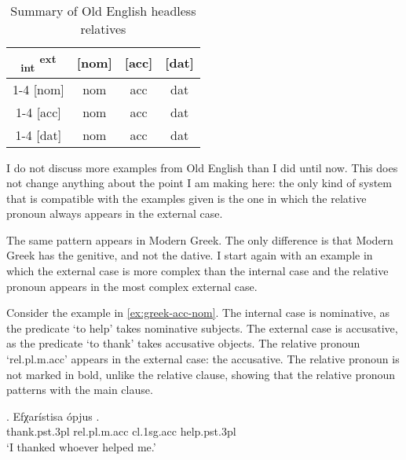 \begin{table}[H]
  \center
  \caption{Summary of Old English headless relatives}
  \begin{tabular}{c|c|c|c}
    \toprule
   \textsubscript{\ac{int}} \textsuperscript{\ac{ext}}
          & [\ac{nom}]
          & [\ac{acc}]
          & [\ac{dat}]
          \\ \cmidrule{1-4}
      [\ac{nom}]
          & \ac{nom}
          & \ac{acc}
          & \cellcolor{LG}\ac{dat}
          \\ \cmidrule{1-4}
      [\ac{acc}]
          & \ac{nom}
          & \ac{acc}
          & \ac{dat}
          \\ \cmidrule{1-4}
      [\ac{dat}]
          & \ac{nom}
          & \cellcolor{DG}\ac{acc}
          & \ac{dat}
          \\
    \bottomrule
  \end{tabular}
  \label{tbl:no-case-competition-old-english}
\end{table}

I do not discuss more examples from Old English than I did until now. This does not change anything about the point I am making here: the only kind of system that is compatible with the examples given is the one in which the relative pronoun always appears in the external case.

The same pattern appears in Modern Greek. The only difference is that Modern Greek has the genitive, and not the dative. I start again with an example in which the external case is more complex than the internal case and the relative pronoun appears in the most complex external case.

Consider the example in \ref{ex:greek-acc-nom}.
The internal case is nominative, as the predicate  `to help' takes nominative subjects.
The external case is accusative, as the predicate  `to thank' takes accusative objects.
The relative pronoun  `\ac{rel}.\ac{pl}.\ac{m}.\ac{acc}' appears in the external case: the accusative. The relative pronoun is not marked in bold, unlike the relative clause, showing that the relative pronoun patterns with the main clause.

\exg. Efχarístisa ópjus  .\\
thank.\ac{pst}.3\ac{pl}\scsub{[acc]} \ac{rel}.\ac{pl}.\ac{m}.\ac{acc} \ac{cl}.1\ac{sg}.\ac{acc} help.\ac{pst}.3\ac{pl}\scsub{[nom]}\\
`I thanked whoever helped me.' \label{ex:greek-acc-nom}

